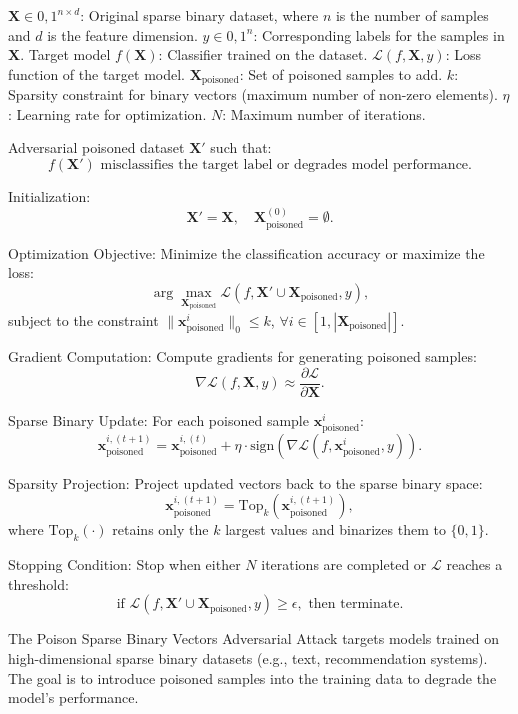 $\mathbf{X} \in {0,1}^{n \times d}$: Original sparse binary dataset, where $n$ is the number of samples and $d$ is the feature dimension.
$y \in {0,1}^n$: Corresponding labels for the samples in $\mathbf{X}$.
Target model $f(\mathbf{X})$: Classifier trained on the dataset.
$\mathcal{L}(f, \mathbf{X}, y)$: Loss function of the target model.
$\mathbf{X}_{\text{poisoned}}$: Set of poisoned samples to add.
$k$: Sparsity constraint for binary vectors (maximum number of non-zero elements).
$\eta$: Learning rate for optimization.
$N$: Maximum number of iterations.

Adversarial poisoned dataset $\mathbf{X}'$ such that:
\[
f(\mathbf{X}') \text{ misclassifies the target label or degrades model performance}.
\]

Initialization:
    \[
    \mathbf{X}' = \mathbf{X}, \quad \mathbf{X}_{\text{poisoned}}^{(0)} = \emptyset.
    \]
    
    Optimization Objective: Minimize the classification accuracy or maximize the loss:
    \[
    \arg \max_{\mathbf{X}_{\text{poisoned}}} \mathcal{L}(f, \mathbf{X}' \cup \mathbf{X}_{\text{poisoned}}, y),
    \]
    subject to the constraint $\|\mathbf{x}_{\text{poisoned}}^i\|_0 \leq k$, $\forall i \in [1, |\mathbf{X}_{\text{poisoned}}|]$.
    
    Gradient Computation: Compute gradients for generating poisoned samples:
    \[
    \nabla \mathcal{L}(f, \mathbf{X}, y) \approx \frac{\partial \mathcal{L}}{\partial \mathbf{X}}.
    \]
    
    Sparse Binary Update: For each poisoned sample $\mathbf{x}_{\text{poisoned}}^i$:
    \[
    \mathbf{x}_{\text{poisoned}}^{i,(t+1)} = \mathbf{x}_{\text{poisoned}}^{i,(t)} + \eta \cdot \text{sign}\left(\nabla \mathcal{L}(f, \mathbf{x}_{\text{poisoned}}^i, y)\right).
    \]
    
    Sparsity Projection: Project updated vectors back to the sparse binary space:
    \[
    \mathbf{x}_{\text{poisoned}}^{i,(t+1)} = \text{Top}_k\left(\mathbf{x}_{\text{poisoned}}^{i,(t+1)}\right),
    \]
    where $\text{Top}_k(\cdot)$ retains only the $k$ largest values and binarizes them to $\{0,1\}$.
    
    Stopping Condition: Stop when either $N$ iterations are completed or $\mathcal{L}$ reaches a threshold:
    \[
    \text{if } \mathcal{L}(f, \mathbf{X}' \cup \mathbf{X}_{\text{poisoned}}, y) \geq \epsilon, \text{ then terminate.}
    \]

The Poison Sparse Binary Vectors Adversarial Attack targets models trained on high-dimensional sparse binary datasets (e.g., text, recommendation systems). The goal is to introduce poisoned samples into the training data to degrade the model's performance.

